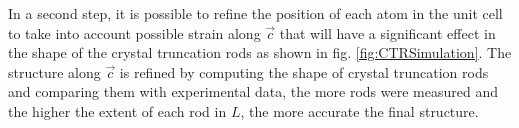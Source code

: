 In a second step, it is possible to refine the position of each atom in the unit cell to take into account possible strain along $\vec{c}$ that will have a significant effect in the shape of the crystal truncation rods as shown in fig. \ref{fig:CTRSimulation}.
The structure along $\vec{c}$ is refined by computing the shape of crystal truncation rods and comparing them with experimental data, the more rods were measured and the higher the extent of each rod in $L$, the more accurate the final structure.
